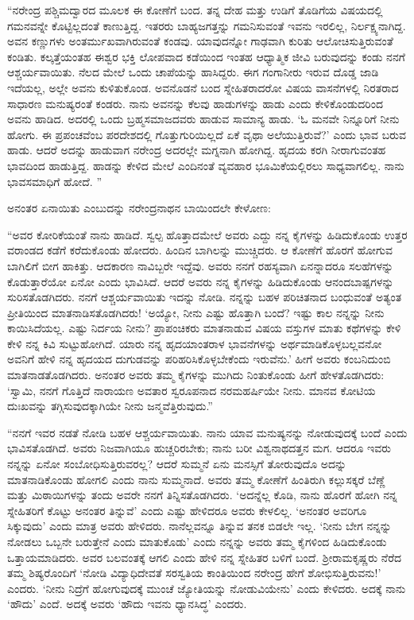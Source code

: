 “ನರೇಂದ್ರ ಪಶ್ಚಿಮದ್ವಾರದ ಮೂಲಕ ಈ ಕೋಣೆಗೆ ಬಂದ. ತನ್ನ ದೇಹ ಮತ್ತು ಉಡಿಗೆ ತೊಡಿಗೆಯ ವಿಷಯದಲ್ಲಿ ಗಮನವನ್ನೇ ಕೊಟ್ಟಿಲ್ಲದಂತೆ ಕಾಣುತ್ತಿದ್ದ. ಇತರರು ಬಾಹ್ಯಜಗತ್ತನ್ನು ಗಮನಿಸುವಂತೆ ಇವನು ಇರಲಿಲ್ಲ, ನಿರ್ಲಕ್ಷ್ಯನಾಗಿದ್ದ. ಅವನ ಕಣ್ಣುಗಳು ಅಂತರ್ಮುಖವಾಗಿರುವಂತೆ ಕಂಡವು. ಯಾವುದನ್ನೋ ಗಾಢವಾಗಿ ಕುರಿತು ಆಲೋಚಿಸುತ್ತಿರುವಂತೆ ಕಂಡಿತು. ಕಲ್ಕತ್ತೆಯಂತಹ ಈಶ್ವರ ಭಕ್ತಿ ಲೋಪವಾದ ಕಡೆಯಿಂದ ಇಂತಹ ಆಧ್ಯಾತ್ಮಿಕ ಜೀವಿ ಬರುವುದನ್ನು ಕಂಡು ನನಗೆ ಆಶ್ಚರ್ಯವಾಯಿತು. ನೆಲದ ಮೇಲೆ ಒಂದು ಚಾಪೆಯನ್ನು ಹಾಸಿದ್ದರು. ಈಗ ಗಂಗಾನೀರು ಇರುವ ದೊಡ್ಡ ಜಾಡಿ ಇದೆಯಲ್ಲ, ಅಲ್ಲೇ ಅವನು ಕುಳಿತುಕೊಂಡ. ಅವನೊಡನೆ ಬಂದ ಸ್ನೇಹಿತರಾದರೋ ವಿಷಯ ವಾಸನೆಗಳಲ್ಲಿ ನಿರತರಾದ ಸಾಧಾರಣ ಮನುಷ್ಯರಂತೆ ಕಂಡರು. ನಾನು ಅವನನ್ನು ಕೆಲವು ಹಾಡುಗಳನ್ನು ಹಾಡು ಎಂದು ಕೇಳಿಕೊಂಡುದರಿಂದ ಅವನು ಹಾಡಿದ. ಅದರಲ್ಲಿ ಒಂದು ಬ್ರಹ್ಮಸಮಾಜದವರು ಹಾಡುವ ಸಾಮಾನ್ಯ ಹಾಡು. ‘ಓ ಮನವೇ ನಿನ್ನೂರಿಗೆ ನೀನು ಹೋಗು. ಈ ಪ್ರಪಂಚವೆಂಬ ಪರದೇಶದಲ್ಲಿ ಗೊತ್ತುಗುರಿಯಿಲ್ಲದೆ ಏಕೆ ವೃಥಾ ಅಲೆಯುತ್ತಿರುವೆ?’ ಎಂದು ಭಾವ ಬರುವ ಹಾಡು. ಆದರೆ ಅದನ್ನು ಹಾಡುವಾಗ ನರೇಂದ್ರ ಅದರಲ್ಲೇ ಮಗ್ನನಾಗಿ ಹೋಗಿದ್ದ. ಹೃದಯ ಕರಗಿ ನೀರಾಗುವಂತಹ ಭಾವದಿಂದ ಹಾಡುತ್ತಿದ್ದ. ಹಾಡನ್ನು ಕೇಳಿದ ಮೇಲೆ ಎಂದಿನಂತೆ ವ್ಯವಹಾರ ಭೂಮಿಕೆಯಲ್ಲಿರಲು ಸಾಧ್ಯವಾಗಲಿಲ್ಲ. ನಾನು ಭಾವಸಮಾಧಿಗೆ ಹೋದೆ. ”

ಅನಂತರ ಏನಾಯಿತು ಎಂಬುದನ್ನು ನರೇಂದ್ರನಾಥನ ಬಾಯಿಂದಲೇ ಕೇಳೋಣ:

“ಅವರ ಕೋರಿಕೆಯಂತೆ ನಾನು ಹಾಡಿದೆ. ಸ್ವಲ್ಪ ಹೊತ್ತಾದಮೇಲೆ ಅವರು ಎದ್ದು ನನ್ನ ಕೈಗಳನ್ನು ಹಿಡಿದುಕೊಂಡು ಉತ್ತರ ವರಾಂಡದ ಕಡೆಗೆ ಕರೆದುಕೊಂಡು ಹೋದರು. ಹಿಂದಿನ ಬಾಗಿಲನ್ನು ಮುಚ್ಚಿದರು. ಆ ಕೋಣೆಗೆ ಹೊರಗೆ ಹೋಗುವ ಬಾಗಿಲಿಗೆ ಬೀಗ ಹಾಕಿತ್ತು. ಆದಕಾರಣ ನಾವಿಬ್ಬರೇ ಇದ್ದೆವು. ಅವರು ನನಗೆ ರಹಸ್ಯವಾಗಿ ಏನನ್ನಾದರೂ ಸಲಹೆಗಳನ್ನು ಕೊಡುತ್ತಾರೆಯೋ ಏನೋ ಎಂದು ಭಾವಿಸಿದೆ. ಆದರೆ ಅವರು ನನ್ನ ಕೈಗಳನ್ನು ಹಿಡಿದುಕೊಂಡು ಆನಂದಬಾಷ್ಪಗಳನ್ನು ಸುರಿಸತೊಡಗಿದರು. ನನಗೆ ಆಶ್ಚರ್ಯವಾಯಿತು ಇದನ್ನು ನೋಡಿ. ನನ್ನನ್ನು ಬಹಳ ಪರಿಚಿತನಾದ ಬಂಧುವಂತೆ ಅತ್ಯಂತ ಪ್ರೀತಿಯಿಂದ ಮಾತನಾಡಿಸತೊಡಗಿದರು! ‘ಅಯ್ಯೋ, ನೀನು ಎಷ್ಟು ಹೊತ್ತಾಗಿ ಬಂದೆ? ಇಷ್ಟು ಕಾಲ ನನ್ನನ್ನು ನೀನು ಕಾಯಿಸಿದೆಯಲ್ಲ. ಎಷ್ಟು ನಿರ್ದಯ ನೀನು? ಪ್ರಾಪಂಚಿಕರು ಮಾತನಾಡುವ ವಿಷಯ ವಸ್ತುಗಳ ಮಾತು ಕಥೆಗಳನ್ನು ಕೇಳಿ ಕೇಳಿ ನನ್ನ ಕಿವಿ ಸುಟ್ಟುಹೋಗಿದೆ. ಯಾರು ನನ್ನ ಹೃದಯಾಂತರಾಳ ಭಾವನೆಗಳನ್ನು ಅರ್ಥಮಾಡಿಕೊಳ್ಳಬಲ್ಲವನೋ ಅವನಿಗೆ ಹೇಳಿ ನನ್ನ ಹೃದಯದ ದುಗುಡವನ್ನು ಪರಿಹರಿಸಿಕೊಳ್ಳಬೇಕೆಂದು ಇರುವೆನು.’ ಹೀಗೆ ಅವರು ಕಂಬನಿದುಂಬಿ ಮಾತನಾಡತೊಡಗಿದರು. ಅನಂತರ ಅವರು ತಮ್ಮ ಕೈಗಳನ್ನು ಮುಗಿದು ನಿಂತುಕೊಂಡು ಹೀಗೆ ಹೇಳತೊಡಗಿದರು: ‘ಸ್ವಾಮಿ, ನನಗೆ ಗೊತ್ತಿದೆ ನಾರಾಯಣ ಅವತಾರ ಸ್ವರೂಪನಾದ ನರಮಹರ್ಷಿಯೇ ನೀನು. ಮಾನವ ಕೋಟಿಯ ದುಃಖವನ್ನು ತಗ್ಗಿಸುವುದಕ್ಕಾಗಿಯೇ ನೀನು ಜನ್ಮವೆತ್ತಿರುವುದು.”

“ನನಗೆ ಇವರ ನಡತೆ ನೋಡಿ ಬಹಳ ಆಶ್ಚರ್ಯವಾಯಿತು. ನಾನು ಯಾವ ಮನುಷ್ಯನನ್ನು ನೋಡುವುದಕ್ಕೆ ಬಂದೆ ಎಂದು ಭಾವಿಸತೊಡಗಿದೆ. ಅವರು ನಿಜವಾಗಿಯೂ ಹುಚ್ಚರಿರಬೇಕು; ನಾನು ಬರೀ ವಿಶ್ವನಾಥದತ್ತನ ಮಗ. ಆದರೂ ಇವರು ನನ್ನನ್ನು ಏನೋ ಸಂಬೋಧಿಸುತ್ತಿರುವರಲ್ಲ? ಆದರೆ ಸುಮ್ಮನೆ ಏನು ಮನಸ್ಸಿಗೆ ತೋರುವುದೊ ಅದನ್ನು ಮಾತನಾಡಿಕೊಂಡು ಹೋಗಲಿ ಎಂದು ನಾನು ಸುಮ್ಮನಾದೆ. ಅವರು ತಮ್ಮ ಕೋಣೆಗೆ ಹಿಂತಿರುಗಿ ಕಲ್ಲುಸಕ್ಕರೆ ಬೆಣ್ಣೆ ಮತ್ತು ಮಿಠಾಯಿಗಳನ್ನು ತಂದು ಅವರೇ ನನಗೆ ತಿನ್ನಿಸತೊಡಗಿದರು. ‘ಅದನ್ನೆಲ್ಲ ಕೊಡಿ, ನಾನು ಹೊರಗೆ ಹೋಗಿ ನನ್ನ ಸ್ನೇಹಿತರಿಗೆ ಕೊಟ್ಟು ಅನಂತರ ತಿನ್ನುವೆ’ ಎಂದು ಎಷ್ಟು ಹೇಳಿದರೂ ಅವರು ಕೇಳಲಿಲ್ಲ. ‘ಅನಂತರ ಅವರಿಗೂ ಸಿಕ್ಕುವುದು’ ಎಂದು ಮಾತ್ರ ಅವರು ಹೇಳಿದರು. ನಾನೆಲ್ಲವನ್ನೂ ತಿನ್ನುವ ತನಕ ಬಿಡಲೇ ಇಲ್ಲ. ‘ನೀನು ಬೇಗ ನನ್ನನ್ನು ನೋಡಲು ಒಬ್ಬನೇ ಬರುತ್ತೇನೆ ಎಂದು ಮಾತುಕೊಡು’ ಎಂದು ನನ್ನನ್ನು ಅವರು ತಮ್ಮ ಕೈಗಳಿಂದ ಹಿಡಿದುಕೊಂಡು ಒತ್ತಾಯಮಾಡಿದರು. ಅವರ ಬಲವಂತಕ್ಕೆ ಆಗಲಿ ಎಂದು ಹೇಳಿ ನನ್ನ ಸ್ನೇಹಿತರ ಬಳಿಗೆ ಬಂದೆ. ಶ‍್ರೀರಾಮಕೃಷ್ಣರು ನೆರೆದ ತಮ್ಮ ಶಿಷ್ಯರೊಂದಿಗೆ ‘ನೋಡಿ ವಿದ್ಯಾಧಿದೇವತೆ ಸರಸ್ವತಿಯ ಕಾಂತಿಯಿಂದ ನರೇಂದ್ರ ಹೇಗೆ ಶೋಭಿಸುತ್ತಿರುವನು!’ ಎಂದರು. ‘ನೀನು ನಿದ್ರೆಗೆ ಹೋಗುವುದಕ್ಕೆ ಮುಂಚೆ ಜ್ಯೋತಿಯನ್ನು ನೋಡುವಿಯೇನು’ ಎಂದು ಕೇಳಿದರು. ಅದಕ್ಕೆ ನಾನು ‘ಹೌದು’ ಎಂದೆ. ಅದಕ್ಕೆ ಅವರು ‘ಹೌದು ಇವನು ಧ್ಯಾನಸಿದ್ಧ’ ಎಂದರು.

